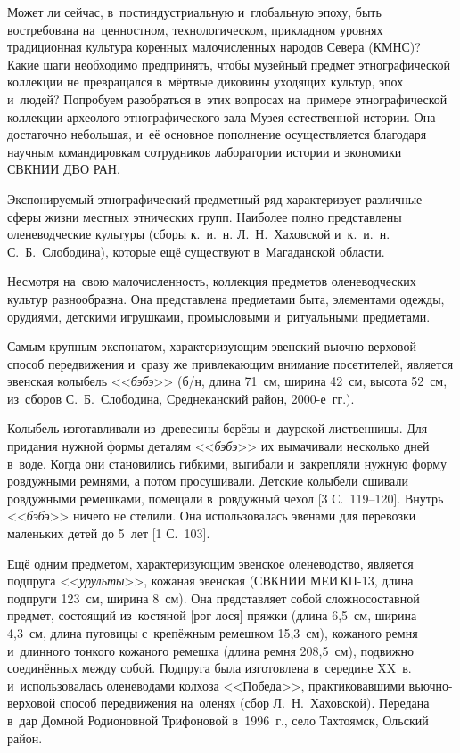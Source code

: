  

\makeProcTitle
{}

Может ли сейчас, в~постиндустриальную и~глобальную эпоху, быть востребована на~ценностном, технологическом, прикладном уровнях традиционная культура коренных малочисленных народов Севера (КМНС)? Какие шаги необходимо предпринять, чтобы музейный предмет этнографической коллекции не превращался в~мёртвые диковины уходящих культур, эпох и~людей? Попробуем разобраться в~этих вопросах на~примере этнографической коллекции археолого-этнографического зала Музея естественной истории. Она достаточно небольшая, и~её основное пополнение осуществляется благодаря научным командировкам сотрудников лаборатории истории и экономики СВКНИИ ДВО РАН.

Экспонируемый этнографический предметный ряд характеризует различные сферы жизни местных этнических групп. Наиболее полно представлены оленеводческие культуры (сборы к.~и.~н. Л.~Н.~Хаховской и~к.~и.~н. С.~Б.~Слободина), которые ещё существуют в~Магаданской области.

Несмотря на~свою малочисленность, коллекция предметов оленеводческих культур разнообразна. Она представлена предметами быта, элементами одежды, орудиями, детскими игрушками, промысловыми и~ритуальными предметами.

Самым крупным экспонатом, характеризующим эвенский вьючно-вер\-хо\-вой способ передвижения и~сразу же привлекающим внимание посетителей, является эвенская колыбель <<\textit{бэбэ}>> (б/н, длина 71~см, ширина 42~см, высота 52~см, из~сборов С.~Б.~Слободина, Среднеканский район, 2000-е~гг.).

Колыбель изготавливали из~древесины берёзы и~даурской лиственницы. Для придания нужной формы деталям <<\textit{бэбэ}>> их вымачивали несколько дней в~воде. Когда они становились гибкими, выгибали и~закрепляли нужную форму ровдужными ремнями, а потом просушивали. Детские колыбели сшивали ровдужными ремешками, помещали в~ровдужный чехол [3 С.~119--120]. Внутрь <<\textit{бэбэ}>> ничего не стелили. Она использовалась эвенами для перевозки маленьких детей до 5~лет [1 С.~103].

Ещё одним предметом, характеризующим эвенское оленеводство, является подпруга <<\textit{урульты}>>, кожаная эвенская (СВКНИИ МЕИ\,КП-13, длина подпруги 123~см, ширина 8~см). Она представляет собой сложносоставной предмет, состоящий из~костяной [рог лося] пряжки (длина 6,5~см, ширина 4,3~см, длина пуговицы с~крепёжным ремешком 15,3~см), кожаного ремня и~длинного тонкого кожаного ремешка (длина ремня 208,5~см), подвижно соединённых между собой. Подпруга была изготовлена в~середине XX~в. и~использовалась оленеводами колхоза <<Победа>>, практиковавшими вьючно-верховой способ передвижения на~оленях (сбор Л.~Н.~Хаховской). Передана в~дар Домной Родионовной Трифоновой в~1996~г., село Тахтоямск, Ольский район.

